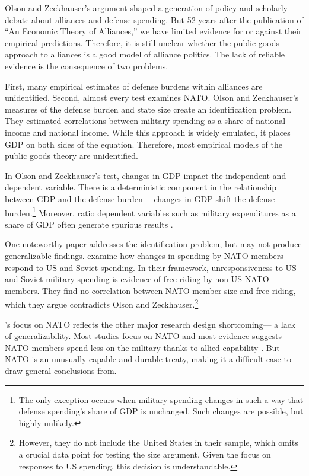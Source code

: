 \documentclass[12pt]{article}
\begin{document}
Olson and Zeckhauser's argument shaped a generation of policy and scholarly debate about alliances and defense spending. 
But 52 years after the publication of ``An Economic Theory of Alliances,'' we have limited evidence for or against their empirical predictions. 
Therefore, it is still unclear whether the public goods approach to alliances is a good model of alliance politics. 
The lack of reliable evidence is the consequence of two problems. 


First, many empirical estimates of defense burdens within alliances are unidentified.
Second, almost every test examines NATO. 
Olson and Zeckhauser's measures of the defense burden and state size create an identification problem. 
They estimated correlations between military spending as a share of national income and national income.
While this approach is widely emulated, it places GDP on both sides of the equation.
Therefore, most empirical models of the public goods theory are unidentified.


In Olson and Zeckhauser's test, changes in GDP impact the independent and dependent variable. 
There is a deterministic component in the relationship between GDP and the defense burden--- changes in GDP shift the defense burden.\footnote{
The only exception occurs when military spending changes in such a way that defense spending's share of GDP is unchanged. Such changes are possible, but highly unlikely.}  
Moreover, ratio dependent variables such as military expenditures as a share of GDP often generate spurious results \citep{Kronmal1993}. 


One noteworthy paper addresses the identification problem, but may not produce generalizable findings. 
\citet{PluemperNeumayer2015} examine how changes in spending by NATO members respond to US and Soviet spending. 
In their framework, unresponsiveness to US and Soviet military spending is evidence of free riding by non-US NATO members.
They find no correlation between NATO member size and free-riding, which they argue contradicts Olson and Zeckhauser.\footnote{
However, they do not include the United States in their sample, which omits a crucial data point for testing the size argument. Given the focus on responses to US spending, this decision is understandable.}


\citet{PluemperNeumayer2015}'s focus on NATO reflects the other major research design shortcoming--- a lack of generalizability. 
Most studies focus on NATO and most evidence suggests NATO members spend less on the military thanks to allied capability \citep{GeorgeSandler2017}.
But NATO is an unusually capable and durable treaty, making it a difficult case to draw general conclusions from. 
\end{document}
